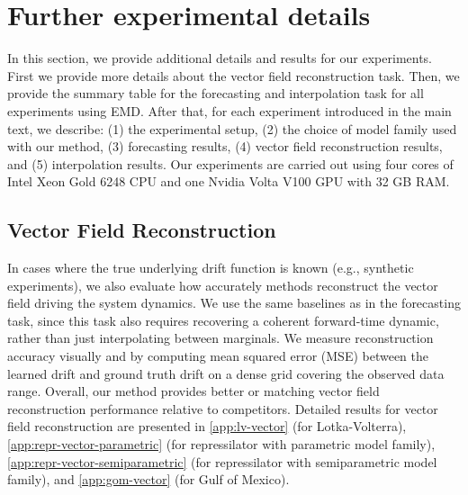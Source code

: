 \section{Further experimental details}
\label{app:further-exp-details}

In this section, we provide additional details and results for our experiments. First we provide more details about the vector field reconstruction task. Then, we provide the summary table for the forecasting and interpolation task for all experiments using EMD. After that, for each experiment introduced in the main text, we describe: (1) the experimental setup, (2) the choice of model family used with our method, (3) forecasting results, (4) vector field reconstruction results, and (5) interpolation results. Our experiments are carried out using four cores of Intel Xeon Gold 6248 CPU and one Nvidia Volta V100 GPU with 32 GB RAM.


\subsection{Vector Field Reconstruction}
\label{app:vector-field-reconstruction}
In cases where the true underlying drift function is known (e.g., synthetic experiments), we also evaluate how accurately methods reconstruct the vector field driving the system dynamics. We use the same baselines as in the forecasting task, since this task also requires recovering a coherent forward-time dynamic, rather than just interpolating between marginals. We measure reconstruction accuracy visually and by computing mean squared error (MSE) between the learned drift and ground truth drift on a dense grid covering the observed data range. Overall, our method provides better or matching vector field reconstruction performance relative to competitors. Detailed results for vector field reconstruction are presented in \cref{app:lv-vector} (for Lotka-Volterra), \cref{app:repr-vector-parametric} (for repressilator with parametric model family), \cref{app:repr-vector-semiparametric} (for repressilator with semiparametric model family), and \cref{app:gom-vector} (for Gulf of Mexico). 

